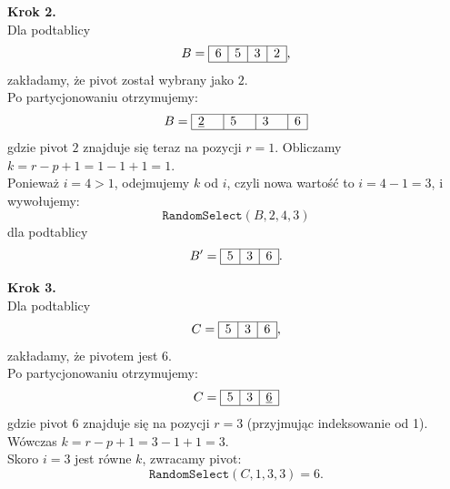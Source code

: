 \documentclass[11pt,a4paper]{article}
\begin{document}
\begin{itemize}
        \bigskip

        \textbf{Krok 2.} \\
        Dla podtablicy
        \[
            B = \begin{array}{|c|c|c|c|}
                \hline
                6 & 5 & 3 & 2 \\ \hline
            \end{array},
        \]
        zakładamy, że pivot został wybrany jako $2$.\\
        Po partycjonowaniu otrzymujemy:
        \[
            B = \begin{array}{|c|c|c|c|}
                \hline
                \underline{2} \quad & 5 \quad & 3 \quad & 6 \\ \hline
            \end{array}
        \]
        gdzie pivot $2$ znajduje się teraz na pozycji $r=1$. Obliczamy $k = r - p + 1 = 1 - 1 + 1 = 1$.\\
        Ponieważ $i=4 > 1$, odejmujemy $k$ od $i$, czyli nowa wartość to $i = 4 - 1 = 3$, i wywołujemy:
        \[
            \texttt{RandomSelect}(B,2,4,3)
        \]
        dla podtablicy
        \[
            B' = \begin{array}{|c|c|c|}
                \hline
                5 & 3 & 6 \\ \hline
            \end{array}.
        \]

        \bigskip

        \textbf{Krok 3.} \\
        Dla podtablicy
        \[
            C = \begin{array}{|c|c|c|}
                \hline
                5 & 3 & 6 \\ \hline
            \end{array},
        \]
        zakładamy, że pivotem jest $6$.\\
        Po partycjonowaniu otrzymujemy:
        \[
            C = \begin{array}{|c|c|c|}
                \hline
                5 & 3 & \underline{6} \\ \hline
            \end{array}
        \]
        gdzie pivot $6$ znajduje się na pozycji $r=3$ (przyjmując indeksowanie od 1). Wówczas $k = r - p + 1 = 3 - 1 + 1 = 3$.\\
        Skoro $i=3$ jest równe $k$, zwracamy pivot:
        \[
            \texttt{RandomSelect}(C,1,3,3)=6.
        \]


\end{itemize}
\end{document}
